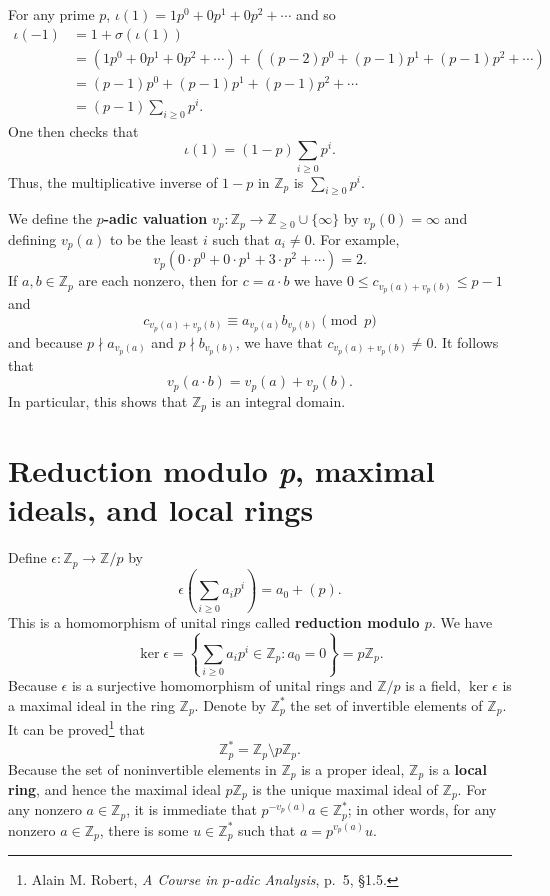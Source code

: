\documentclass{article}
\theoremstyle{definition}
\theoremstyle{definition}
\begin{document}
For any prime $p$, $\iota(1)=1p^0+0p^1+0p^2+\cdots$ and so
\begin{align*}
\iota(-1)&=1+\sigma(\iota(1)) \\
&= (1p^0+0p^1+0p^2+\cdots)+ ((p-2)p^0+(p-1)p^1+(p-1)p^2+\cdots)\\
&=(p-1)p^0+(p-1)p^1+(p-1)p^2+\cdots\\
&=(p-1)\sum_{i\geq 0}p^i.
\end{align*}
One then checks that
\[
\iota(1) = (1-p) \sum_{i \geq 0}p^i.
\]
Thus, the multiplicative inverse of $1-p$ in $\mathbb{Z}_p$ is $\sum_{i \geq 0}p^i$. 

We define the \textbf{$p$-adic valuation} $v_p:\mathbb{Z}_p \to \mathbb{Z}_{\geq 0} \cup \{\infty\}$ by
$v_p(0)=\infty$ and  defining $v_p(a)$ to be the least $i$ such that $a_i \neq 0$. For example,
\[
v_p(0\cdot p^0 + 0\cdot p^1+3\cdot p^2+\cdots) = 2.
\]
If $a,b \in \mathbb{Z}_p$ are each nonzero, then for $c=a\cdot b$ we have $0 \leq c_{v_p(a)+v_p(b)} \leq p-1$ and
\[
c_{v_p(a)+v_p(b)} \equiv a_{v_p(a)} b_{v_p(b)} \pmod{p}
\]
and because $p \nmid a_{v_p(a)}$ and $p \nmid b_{v_p(b)}$,
we have that $c_{v_p(a)+v_p(b)} \neq 0$. It follows that
\[
v_p(a\cdot b) = v_p(a) + v_p(b).
\]
In particular, this shows that $\mathbb{Z}_p$ is an integral domain. 


\section{Reduction modulo {\em p}, maximal ideals, and local rings}
Define $\epsilon:\mathbb{Z}_p \to \mathbb{Z}/p$ by
\[
\epsilon\left(\sum_{i \geq 0} a_i p^i\right) = a_0 + (p).
\]
This is a homomorphism of unital rings called \textbf{reduction modulo $p$}. We have
\[
\ker \epsilon =\left\{\sum_{i \geq 0} a_i p^i \in \mathbb{Z}_p: a_0 =0 \right\}
=p\mathbb{Z}_p.
\]
Because $\epsilon$ is a surjective homomorphism of unital rings and $\mathbb{Z}/p$ is a field, $\ker \epsilon$ is a maximal ideal
in the ring $\mathbb{Z}_p$. Denote by $\mathbb{Z}_p^*$ the set of invertible elements of $\mathbb{Z}_p$. It can be proved\footnote{Alain M. Robert, {\em A Course in $p$-adic Analysis},
p.~5, \S 1.5.}
 that
 \[
\mathbb{Z}_p^*=\mathbb{Z}_p \setminus p\mathbb{Z}_p.
\]
Because the set of noninvertible elements in $\mathbb{Z}_p$ is a proper ideal, $\mathbb{Z}_p$ is a \textbf{local ring},
and hence the maximal ideal $p\mathbb{Z}_p$ is the unique maximal ideal of $\mathbb{Z}_p$. 
For any nonzero $a \in \mathbb{Z}_p$, it is immediate that $p^{-v_p(a)}a \in \mathbb{Z}_p^*$; in other words, for any nonzero
$a \in \mathbb{Z}_p$, there is some $u \in \mathbb{Z}_p^*$ such that $a=p^{v_p(a)} u$. 
\end{document}
